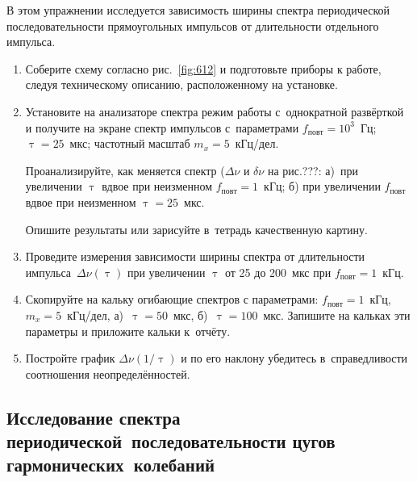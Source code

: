 \begin{lab:task}

В этом упражнении исследуется зависимость ширины спектра периодической последовательности прямоугольных импульсов от длительности отдельного импульса.

\begin{enumerate}
	\item Соберите схему согласно рис.~\ref{fig:612} и подготовьте приборы к работе, следуя техническому описанию, расположенному на установке.
	\item Установите на анализаторе спектра режим работы с~однократной развёрткой и получите на экране спектр импульсов с~параметрами $f_{повт}=10^3$~Гц; $\uptau=25$~мкс; частотный масштаб $m_x=5$~кГц/дел.

	Проанализируйте, как меняется спектр ($\Delta\nu$ и $\delta\nu$ на рис.???:
	а)~при увеличении $\uptau$ вдвое при неизменном $f_{повт}=1$~кГц; 
	б) при увеличении $f_{повт}$ вдвое при неизменном $\uptau=25$~мкс.
	
	Опишите результаты или зарисуйте в~тетрадь качественную картину.
	\item Проведите измерения зависимости ширины спектра от длительности импульса~$\Delta \nu(\uptau)$ при увеличении $\uptau$ от 25 до 200~мкс при $f_{повт}=1$~кГц.
	\item Скопируйте на кальку  огибающие спектров с параметрами: $f_{повт}=1$~кГц, $m_x=5$~кГц/дел, а)~$\uptau=50$~мкс, б)~$\uptau=100$~мкс. Запишите на кальках эти параметры и приложите кальки к~отчёту.
	\item Постройте график $\Delta \nu(1/\uptau)$ и по его наклону убедитесь в~справедливости соотношения неопределённостей.
\end{enumerate}
\end{lab:task}

\subsection*{Исследование спектра периодической~последовательности цугов гармонических~колебаний}


